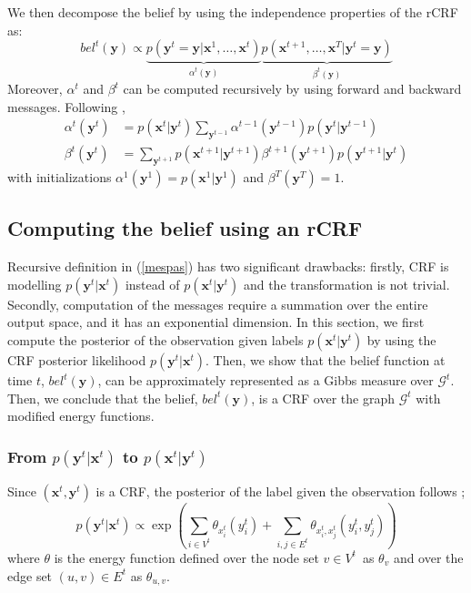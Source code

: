 We then decompose the belief by using the independence properties of the rCRF as:
\begin{equation}
bel^t(\mathbf{y}) \propto  \underbrace{p(\mathbf{y}^t=\mathbf{y}|\mathbf{x}^1,\ldots,\mathbf{x}^t)}_{\alpha^t(\mathbf{y})} \underbrace{p(\mathbf{x}^{t+1},\ldots,\mathbf{x}^T|\mathbf{y}^t=\mathbf{y})}_{\beta^t(\mathbf{y})}
\label{beldec}
\end{equation}
Moreover, $\alpha^t$ and $\beta^t$ can be computed recursively by using forward and backward  messages. Following \cite{hmm},
\begin{equation}
\begin{aligned}
\alpha^t(\mathbf{y}^t) &= p(\mathbf{x}^t|\mathbf{y}^t)\sum_{\mathbf{y}^{t-1}} \alpha^{t-1}(\mathbf{y}^{t-1}) p(\mathbf{y}^{t}|\mathbf{y}^{t-1}) \\
\beta^t(\mathbf{y}^t) &= \sum_{\mathbf{y}^{t+1}} p(\mathbf{x}^{t+1}|\mathbf{y}^{t+1}) \beta^{t+1}(\mathbf{y}^{t+1}) p(\mathbf{y}^{t+1}|\mathbf{y}^{t})
\end{aligned}
\label{mespas}
\end{equation}
\noindent
with initializations $\alpha^1(\mathbf{y}^1)=p(\mathbf{x}^1|\mathbf{y}^1)$ and $\beta^T(\mathbf{y}^T)=1$.

\subsection{Computing the belief using an rCRF}
\label{fromto}
Recursive definition in (\ref{mespas}) has two significant drawbacks:
 firstly, CRF is modelling $p(\mathbf{y}^t|\mathbf{x}^t)$ instead of $p(\mathbf{x}^t|\mathbf{y}^t)$ and the transformation is not trivial. Secondly, computation of the messages require a summation over the entire output space, and it has an exponential dimension. In this section, we first compute the posterior of the observation given labels $p(\mathbf{x}^t|\mathbf{y}^t)$ by using the CRF posterior likelihood $p(\mathbf{y}^t|\mathbf{x}^t)$. Then, we show that the belief function at time $t$, $bel^t(\mathbf{y})$, can be approximately represented as a Gibbs measure over $\mathcal{G}^t$. Then, we conclude that the belief, $bel^t(\mathbf{y})$, is a CRF over the graph $\mathcal{G}^t$ with modified energy functions.
\subsubsection{From $p(\mathbf{y}^t|\mathbf{x}^t)$ to $p(\mathbf{x}^t|\mathbf{y}^t)$}
Since $(\mathbf{x}^t,\mathbf{y}^t)$ is a CRF, the posterior of the label given the observation follows \cite{geman}; %
\begin{equation}
p(\mathbf{y}^t|\mathbf{x}^t) \propto \exp\left( \sum_{i \in V^t} \theta_{x^t_i}(y^t_i) + \sum_{i,j \in E^t} \theta_{x^t_i,x^t_j}(y^t_i,y^t_j)  \right)
\label{crflogl}
\end{equation}
where $\theta$ is the energy function defined over the node set \mbox{$v \in V^t$ }as $\theta_{v}$ and over the edge set \mbox{$(u,v) \in E^t$} as $\theta_{u,v}$.

